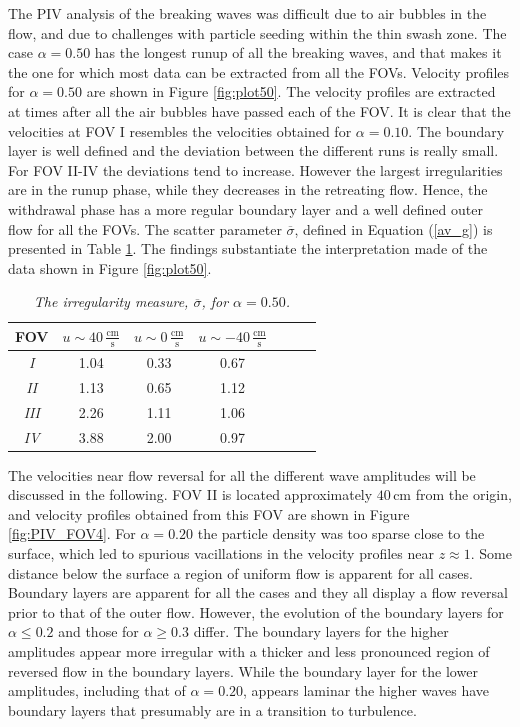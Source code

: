 \documentclass[review, authoryear]{elsarticle}
\newcommand{\cm}{\,\mbox{cm}}
\newcommand{\cmbps}{\,\frac{\mbox{cm}}{\mbox{s}}}
\begin{document}
The PIV analysis of the breaking waves was difficult due to air bubbles in the flow, and due to challenges with particle seeding within the thin swash zone.  The case $\alpha=0.50$ has the longest runup of all the breaking waves, and that makes it the one for which 
 most data can be extracted from all the FOVs. Velocity profiles for $\alpha=0.50$ are shown in Figure \ref{fig:plot50}. The velocity profiles are extracted at times after all the air bubbles have passed each of the FOV. It is clear that the velocities at FOV I resembles the velocities obtained for $\alpha=0.10$. The boundary layer is well defined and the deviation between the different runs is really small. For FOV II-IV the deviations tend to increase. However the largest irregularities are in the
 runup phase, while they decreases in the retreating flow. Hence, the withdrawal phase has a more regular boundary layer and a well defined outer flow for all the FOVs. The scatter parameter $\overline{\sigma}$, defined in Equation (\ref{av_g}) is presented in Table \ref{tab:irr}. The findings substantiate the interpretation made of the data shown in Figure \ref{fig:plot50}.


\begin{table}[]
\caption{\textit{The irregularity measure, $\overline{\sigma}$, for $\alpha=0.50$.}}
\centering
\begin{tabular}{ccccccc}
\hline
FOV& $  u\sim40\cmbps$  &$ u\sim 0\cmbps$ & $u\sim -40\cmbps$   \\ \hline
\textit{I}  & 1.04   &    0.33  & 0.67                       \\
\textit{II}  & 1.13   &    0.65   & 1.12                    \\
\textit{III} &  2.26   &    1.11 &  1.06                            \\
\textit{IV}  & 3.88    &   2.00  & 0.97                 \\
\end{tabular}
\label{tab:irr}
\end{table}



The velocities near flow reversal for all the different wave amplitudes will be discussed in the following. FOV II is located approximately $40\cm$ from the origin, and velocity 
profiles obtained from this FOV are shown in Figure \ref{fig:PIV_FOV4}.
For $\alpha=0.20$ the particle density was too sparse close to the surface, which led to spurious vacillations in the velocity profiles near  $z\approx1$. Some distance below the surface a region of uniform flow is apparent for all cases. 
Boundary layers are apparent for all the cases and they all
display a flow reversal prior to that of the outer flow.
However, the evolution of the boundary layers for 
$\alpha\le 0.2$ and those for $\alpha\ge 0.3$ differ.
The boundary layers for the higher amplitudes appear more irregular
with a thicker and less pronounced region of reversed flow in the 
boundary layers. 
While the boundary layer for the lower amplitudes, including that of $\alpha=0.20$, appears laminar the higher waves have boundary layers that 
presumably are in a transition to turbulence.   
\end{document}
